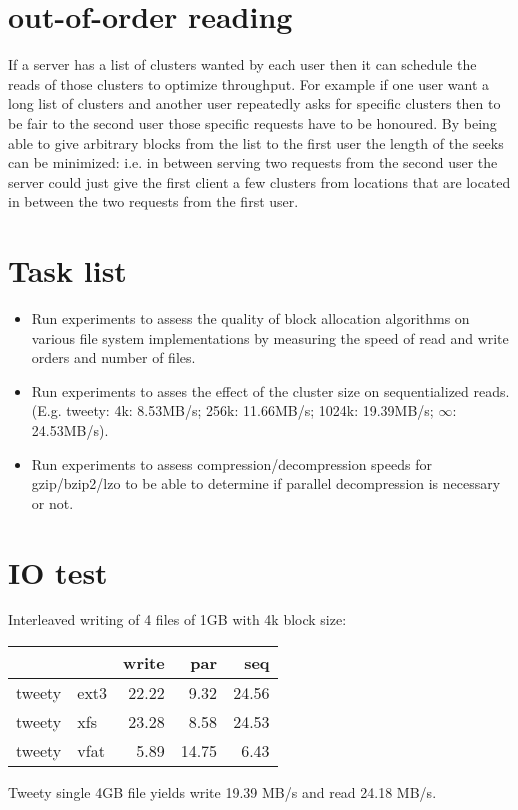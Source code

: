 \documentclass{article}
\begin{document}
\section{out-of-order reading}

If a server has a list of clusters wanted by each user then it can schedule the reads of
those clusters to optimize throughput. For example if one user want a long list of clusters
and another user repeatedly asks for specific clusters then to be fair to the second user those
specific requests have to be honoured. By being able to give arbitrary blocks from the list to
the first user the length of the seeks can be minimized: i.e. in between serving two requests
from the second user the server could just give the first client a few clusters from
locations that are located in between the two requests from the first user.

\section{Task list}

\begin{itemize}
\item Run experiments to assess the quality of block allocation algorithms on various
file system implementations by measuring the speed of read and write orders and number of files.
\item Run experiments to asses the effect of the cluster size on sequentialized reads.
(E.g. tweety: 4k: 8.53MB/s; 256k: 11.66MB/s; 1024k: 19.39MB/s; $\infty$: 24.53MB/s).
\item Run experiments to assess compression/decompression speeds for gzip/bzip2/lzo
to be able to determine if parallel decompression is necessary or not.
\end{itemize}

\section{IO test}

Interleaved writing of 4 files of 1GB with 4k block size:
\begin{tabular}{llrrr}
\hline
&&write&par&seq
\\\hline
tweety & ext3 & 22.22 & 9.32 & 24.56
\\\hline
tweety & xfs & 23.28 & 8.58 & 24.53
\\\hline
tweety & vfat & 5.89 & 14.75 & 6.43
\\\hline
\end{tabular}

Tweety single 4GB file yields write 19.39 MB/s and read 24.18 MB/s.
\end{document}
